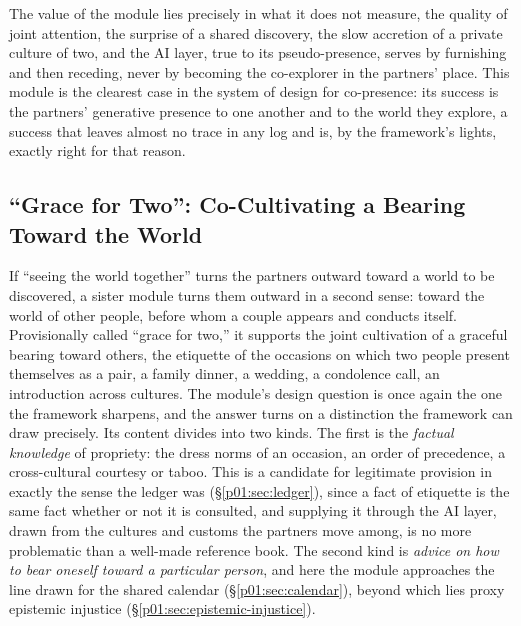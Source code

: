 The value of the module lies precisely in what it does not measure, the quality of joint attention, the surprise of a shared discovery, the slow accretion of a private culture of two, and the AI layer, true to its pseudo-presence, serves by furnishing and then receding, never by becoming the co-explorer in the partners' place. This module is the clearest case in the system of design for co-presence: its success is the partners' generative presence to one another and to the world they explore, a success that leaves almost no trace in any log and is, by the framework's lights, exactly right for that reason.

\subsection{``Grace for Two'': Co-Cultivating a Bearing Toward the World}\label{p01:sec:gracefortwo}

If ``seeing the world together'' turns the partners outward toward a world to be discovered, a sister module turns them outward in a second sense: toward the world of other people, before whom a couple appears and conducts itself. Provisionally called ``grace for two,'' it supports the joint cultivation of a graceful bearing toward others, the etiquette of the occasions on which two people present themselves as a pair, a family dinner, a wedding, a condolence call, an introduction across cultures. The module's design question is once again the one the framework sharpens, and the answer turns on a distinction the framework can draw precisely. Its content divides into two kinds. The first is the \emph{factual knowledge} of propriety: the dress norms of an occasion, an order of precedence, a cross-cultural courtesy or taboo. This is a candidate for legitimate provision in exactly the sense the ledger was (§\ref{p01:sec:ledger}), since a fact of etiquette is the same fact whether or not it is consulted, and supplying it through the AI layer, drawn from the cultures and customs the partners move among, is no more problematic than a well-made reference book. The second kind is \emph{advice on how to bear oneself toward a particular person}, and here the module approaches the line drawn for the shared calendar (§\ref{p01:sec:calendar}), beyond which lies proxy epistemic injustice (§\ref{p01:sec:epistemic-injustice}).

